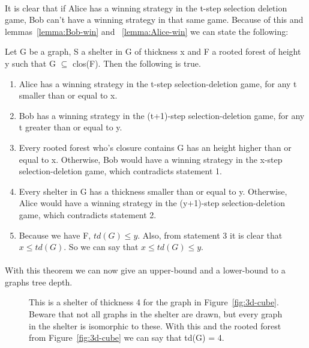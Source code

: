 \paragraph{}
It is clear that if Alice has a winning strategy in the t-step selection deletion game, Bob can't have a winning strategy in that same game. Because of this and lemmas~\ref{lemma:Bob-win} and ~\ref{lemma:Alice-win} we can state the following:
\begin{theorem}
Let G be a graph, S a shelter in G of thickness x and F a rooted forest of height y such that G $\subseteq$ clos(F). Then the following is true.
\begin{enumerate}
\item Alice has a winning strategy in the t-step selection-deletion game, for any t smaller than or equal to x.
\item Bob has a winning strategy in the (t+1)-step selection-deletion game, for any t greater than or equal to y.
\item Every rooted forest who's closure contains G has an height higher than or equal to x. Otherwise, Bob would have a winning strategy in the x-step selection-deletion game, which contradicts statement 1.
\item Every shelter in G has a thickness smaller than or equal to y. Otherwise, Alice would have a winning strategy in the (y+1)-step selection-deletion game, which contradicts statement 2.
\item Because we have F, $td(G) \leq y$. Also, from statement 3 it is clear that $x \leq td(G)$. So we can say that $x \leq td(G) \leq y$.
\end{enumerate}
\end{theorem}

\paragraph{}
With this theorem we can now give an upper-bound and a lower-bound to a graphs tree depth.

\begin{figure}[H]

\caption{This is a shelter of thickness 4 for the graph in Figure~\ref{fig:3d-cube}. Beware that not all graphs in the shelter are drawn, but every graph in the shelter is isomorphic to these. With this and the rooted forest from Figure~\ref{fig:3d-cube} we can say that td(G) = 4. 
\label{fig:3d-cube-shelter}}
\end{figure}